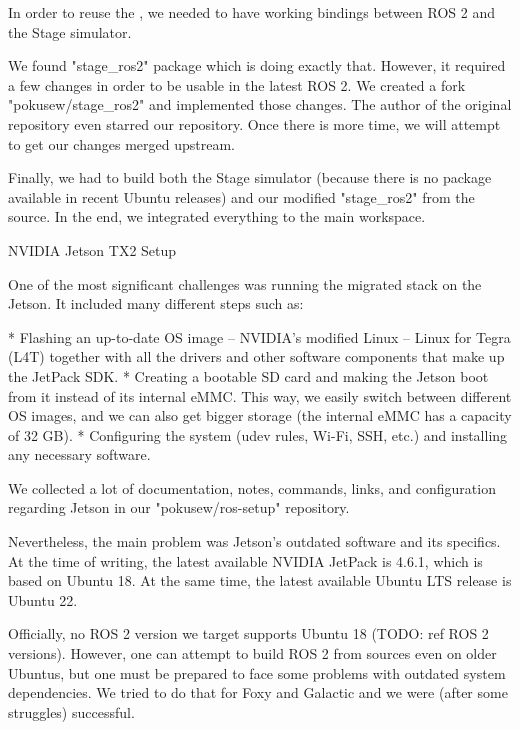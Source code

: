 In order to reuse the , we needed to have working bindings between ROS 2 and the Stage simulator.

We found "stage_ros2" package which is doing exactly that. However, it required a few changes in order to be usable in the latest ROS 2. We created a fork "pokusew/stage_ros2" and implemented those changes. The author of the original repository even starred our repository. Once there is more time, we will attempt to get our changes merged upstream.

Finally, we had to build both the Stage simulator (because there is no package available in recent Ubuntu releases) and our modified "stage_ros2" from the source. In the end, we integrated everything to the main workspace.

\vfill

\secc NVIDIA Jetson TX2 Setup

One of the most significant challenges was running the migrated stack on the Jetson. It included many different steps such as:

\begitems
* Flashing an up-to-date OS image – NVIDIA's modified Linux – Linux for Tegra (L4T) together with all the drivers and other software components that make up the JetPack SDK.
* Creating a bootable SD card and making the Jetson boot from it instead of its internal eMMC. This way, we easily switch between different OS images, and we can also get bigger storage (the internal eMMC has a capacity of 32 GB).
* Configuring the system (udev rules, Wi-Fi, SSH, etc.) and installing any necessary software.
\enditems

We collected a lot of documentation, notes, commands, links, and configuration regarding Jetson in our "pokusew/ros-setup" repository.

Nevertheless, the main problem was Jetson's outdated software and its specifics. At the time of writing, the latest available NVIDIA JetPack is 4.6.1, which is based on Ubuntu 18. At the same time, the latest available Ubuntu LTS release is Ubuntu 22.

Officially, no ROS 2 version we target supports Ubuntu 18 (TODO: ref ROS 2 versions). However, one can attempt to build ROS 2 from sources even on older Ubuntus, but one must be prepared to face some problems with outdated system dependencies. We tried to do that for Foxy and Galactic and we were (after some struggles) successful.

